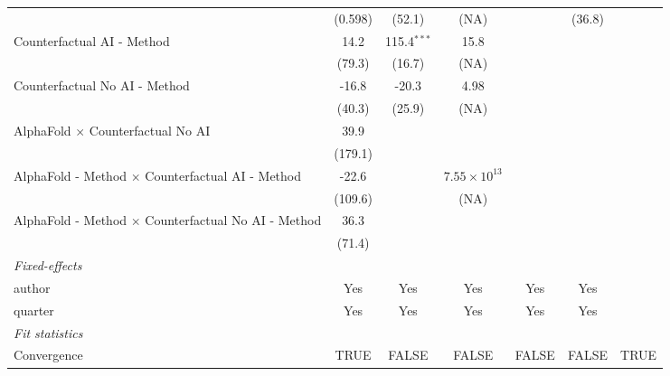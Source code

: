 \begin{tabular}{lcccccc}
                                                              & (0.598)  & (52.1)        & (NA)                  &              & (36.8)  &   \\   
   Counterfactual AI - Method                                 & 14.2     & 115.4$^{***}$ & 15.8                  &              &         &   \\   
                                                              & (79.3)   & (16.7)        & (NA)                  &              &         &   \\   
   Counterfactual No AI - Method                              & -16.8    & -20.3         & 4.98                  &              &         &   \\   
                                                              & (40.3)   & (25.9)        & (NA)                  &              &         &   \\   
   AlphaFold $\times$ Counterfactual No AI                    & 39.9     &               &                       &              &         &   \\   
                                                              & (179.1)  &               &                       &              &         &   \\   
   AlphaFold - Method $\times$ Counterfactual AI - Method     & -22.6    &               & $7.55\times 10^{13}$  &              &         &   \\   
                                                              & (109.6)  &               & (NA)                  &              &         &   \\   
   AlphaFold - Method $\times$ Counterfactual No AI - Method  & 36.3     &               &                       &              &         &   \\   
                                                              & (71.4)   &               &                       &              &         &   \\   
   \midrule
   \emph{Fixed-effects}\\
   author                                                     & Yes      & Yes           & Yes                   & Yes          & Yes     & \\  
   quarter                                                    & Yes      & Yes           & Yes                   & Yes          & Yes     & \\  
   \midrule
   \emph{Fit statistics}\\
   Convergence                                                &TRUE      & FALSE         & FALSE                 & FALSE        & FALSE   & TRUE\\  

\end{tabular}
